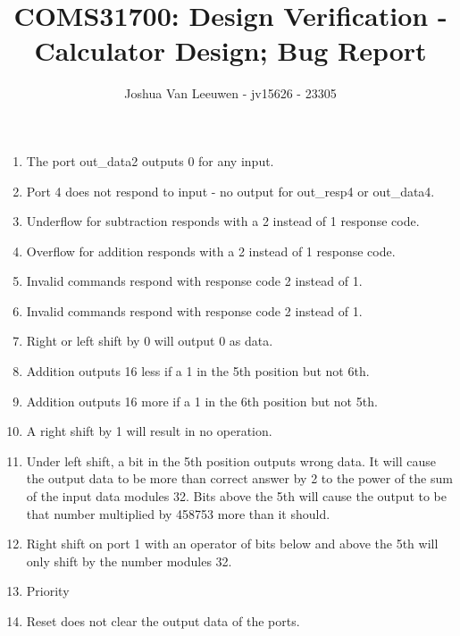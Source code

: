 \documentclass[a4paper]{article}
\title{\vspace{-0.7em}COMS31700: Design Verification - Calculator Design; Bug Report\vspace{-0.7em}}
\author{Joshua Van Leeuwen - jv15626 - 23305}
\date{}
\begin{document}
\vspace{-10em}
\maketitle

\vspace{-5.1em}
\begin{enumerate}
    \item The port out\_data2 outputs 0 for any input.
    \item Port 4 does not respond to input - no output for out\_resp4 or out\_data4.
    \item Underflow for subtraction responds with a 2 instead of 1 response code.
    \item Overflow for addition responds with a 2 instead of 1 response code.
    \item Invalid commands respond with response code 2 instead of 1.
    \item Invalid commands respond with response code 2 instead of 1.
    \item Right or left shift by 0 will output 0 as data.
    \item Addition outputs 16 less if a 1 in the 5th position but not 6th.
    \item Addition outputs 16 more if a 1 in the 6th position but not 5th.
    \item A right shift by 1 will result in no operation.
    \item Under left shift, a bit in the 5th position outputs wrong data. It will cause the output data to be more than correct answer by 2 to the power of the sum of the input data modules 32. Bits above the 5th will cause the output to be that number multiplied by 458753 more than it should.
    \item Right shift on port 1 with an operator of bits below and above the 5th will only shift by the number modules 32.
    \item Priority
    \item Reset does not clear the output data of the ports.
\end{enumerate}
\end{document}
